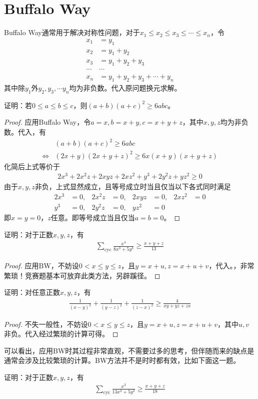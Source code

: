 
\section{Buffalo Way}
\label{sec:buffalo-way}

Buffalo Way通常用于解决对称性问题，对于$x_1\le x_2\le x_3\le \cdots\le x_n$，令
\begin{align*}
  x_1&=y_1\\
  x_2&=y_1+y_2\\
  x_3&=y_1+y_2+y_3\\
  \cdots&\cdots\\
  x_n&=y_1+y_2+y_3+\cdots+y_n
\end{align*}
其中除$y_1$外$y_2,y_3,\cdots y_n$均为非负数。代入原问题换元求解。

\begin{example}
  证明：若$0\le a\le b\le c$，则$(a+b)(a+c)^2\ge 6abc$。
\end{example}
\begin{proof}
  应用Buffalo Way，令$a=x, b=x+y, c=x+y+z$，其中$x,y,z$均为非负数。代入，有
  \begin{align*}
    &(a+b)(a+c)^2\ge 6abc\\
    \iff& (2x+y)(2x+y+z)^2\ge 6x(x+y)(x+y+z)
  \end{align*}
  化简后上式等价于
  \begin{align*}
    2x^3+2x^2z+2xyz+2xz^2+y^3+2y^2z+yz^2\ge 0
  \end{align*}
  由于$x,y,z$非负，上式显然成立，且等号成立时当且仅当以下各式同时满足
  \begin{align*}
    2x^3&=0,    &2x^2z&=0,  &2xyz&=0,  &2xz^2&=0\\
    y^3&=0,     &2y^2z&=0,  &yz^2&=0   &     &
  \end{align*}
  即$x=y=0$，$z$任意。即等号成立当且仅当$a=b=0$。
\end{proof}

\begin{example}
  证明：对于正数$x,y,z$，有
  \begin{align*}
    \sum_{\mathrm{cyc}} \frac{x^4}{8x^3+5y^3}\ge\frac{x+y+z}{13}
  \end{align*}
\end{example}
\begin{proof}
  应用BW，不妨设$0<x\le y\le z$，且$y=x+u, z=x+u+v$，代入。\color{red}，非常繁琐！竞赛题基本可放弃此类方法，另辟蹊径。
\end{proof}

\begin{example}
  证明：对任意正数$x,y,z$，有
  \begin{align*}
    \frac1{(x-y)^2}+\frac1{(y-z)^2}+\frac1{(z-x)^2}\ge\frac4{xy+yz+zx}
  \end{align*}
\end{example}
\begin{proof}
  不失一般性，不妨设$0<x\le y\le z$，且$y=x+u,z=x+u+v$，其中$u,v$非负。代入经过繁琐的计算可得。
\end{proof}


可以看出，应用BW时其过程非常直观，不需要过多的思考，但伴随而来的缺点是通常会涉及比较繁琐的计算。BW方法并不是时时都有效，比如下面这一题。
\begin{example}
  证明：对于正数$x,y,z$，有
  \begin{align*}
    \sum_{\mathrm{cyc}} \frac{x^3}{13x^2+5y^2}\ge\frac{x+y+z}{18}
  \end{align*}
\end{example}
